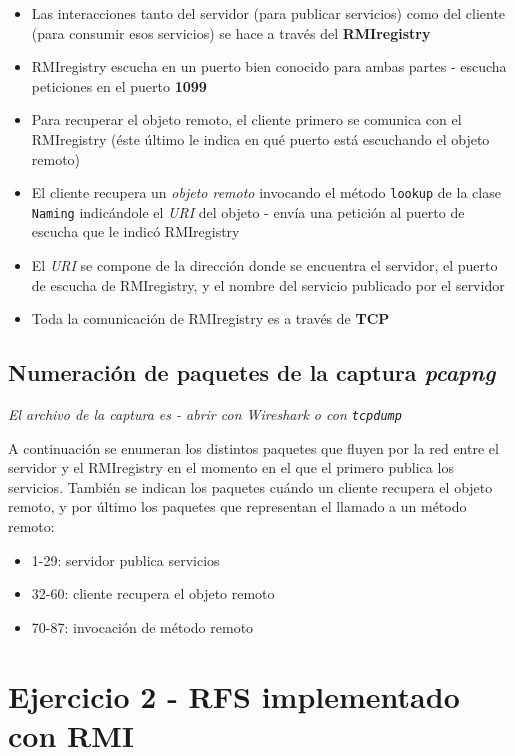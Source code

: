 \begin{itemize}
    \item Las interacciones tanto del servidor (para publicar servicios) como del cliente (para consumir esos servicios) se hace a través del \textbf{RMIregistry} 
    \item RMIregistry escucha en un puerto bien conocido para ambas partes - escucha peticiones en el puerto \textbf{1099}
    \item Para recuperar el objeto remoto, el cliente primero se comunica con el RMIregistry (éste último le indica en qué puerto está escuchando el objeto remoto)
    \item El cliente recupera un \emph{objeto remoto} invocando el método \texttt{lookup} de la clase \texttt{Naming} indicándole el \emph{URI} del objeto - envía una petición al puerto de escucha que le indicó RMIregistry
    \item El \emph{URI} se compone de la dirección donde se encuentra el servidor, el puerto de escucha de RMIregistry, y el nombre del servicio publicado por el servidor
    \item Toda la comunicación de RMIregistry es a través de \textbf{TCP} 
\end{itemize}

\subsection{Numeración de paquetes de la captura \emph{pcapng}}

\emph{El archivo de la captura es  - abrir con Wireshark o con \texttt{tcpdump}} 

A continuación se enumeran los distintos paquetes que fluyen por la red entre el servidor y el RMIregistry en el momento en el que el primero publica los servicios. También se indican los paquetes cuándo un cliente recupera el objeto remoto, y por último los paquetes que representan el llamado a un método remoto: 

\begin{itemize}
    \item 1-29: servidor publica servicios
    \item 32-60: cliente recupera el objeto remoto
    \item 70-87: invocación de método remoto
\end{itemize}

\section{Ejercicio 2 - RFS implementado con RMI}

